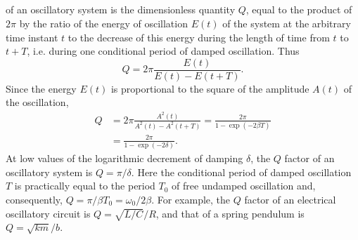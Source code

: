 \subsection{}\label{29.1.5}  of an oscillatory system is the dimensionless quantity $Q$, equal to the product of $2\pi$ by the ratio of the energy of oscillation $E (t)$ of the system at the arbitrary time instant $t$ to the decrease of this energy during the length of time from $t$ to $t + T$, i.e. during one conditional period of damped oscillation. Thus
\begin{equation*}%
Q = 2 \pi \frac{E(t)}{E(t) - E(t+T)}.
\end{equation*}
Since the energy $E (t)$ is proportional to the square of the amplitude $A (t)$ of the oscillation,
\begin{align*}%
Q & = 2 \pi \frac{A^{2}(t)}{A^{2}(t) - A^{2}(t+T)} = \frac{2\pi}{1 - \exp(-2 \beta T)}\\ 
& = \frac{2\pi}{1 - \exp(-2\delta)}.
\end{align*}
At low values of the logarithmic decrement of damping $\delta$, the $Q$ factor of an oscillatory system is $Q = \pi/\delta$. Here the conditional period of damped oscillation $T$ is practically equal to the period $T_{0}$ of free undamped oscillation and, consequently, $Q = \pi/\beta T_{0} = \omega_{0}/2\beta$. For example, the $Q$ factor of an electrical
oscillatory circuit  is $Q = \sqrt{L/C}/R$, and that of a spring pendulum  is $Q = \sqrt{km}/b$.

